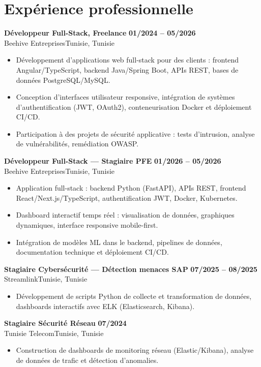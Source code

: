 \documentclass[a4paper,10pt]{article}
\newcommand{\cventry}[4]{\textbf{#1} \hfill \textbf{#4}\\[1pt]#2{\ifx\relax#3\relax\else, #3\fi}\par\vspace{1pt}}
\begin{document}
\section{Expérience professionnelle}
\cventry{Développeur Full-Stack, Freelance}{Beehive Entreprises}{Tunisie}{01/2024 -- 05/2026}
\begin{itemize}
  \item Développement d'applications web full-stack pour des clients : frontend Angular/TypeScript, backend Java/Spring Boot, APIs REST, bases de données PostgreSQL/MySQL.
  \item Conception d'interfaces utilisateur responsive, intégration de systèmes d'authentification (JWT, OAuth2), conteneurisation Docker et déploiement CI/CD.
  \item Participation à des projets de sécurité applicative : tests d'intrusion, analyse de vulnérabilités, remédiation OWASP.
\end{itemize}
\cventry{Développeur Full-Stack --- Stagiaire PFE}{Beehive Entreprises}{Tunisie}{01/2026 -- 05/2026}
\begin{itemize}
  \item Application full-stack : backend Python (FastAPI), APIs REST, frontend React/Next.js/TypeScript, authentification JWT, Docker, Kubernetes.
  \item Dashboard interactif temps réel : visualisation de données, graphiques dynamiques, interface responsive mobile-first.
  \item Intégration de modèles ML dans le backend, pipelines de données, documentation technique et déploiement CI/CD.
\end{itemize}
\cventry{Stagiaire Cybersécurité --- Détection menaces SAP}{Streamlink}{Tunisie}{07/2025 -- 08/2025}
\begin{itemize}
  \item Développement de scripts Python de collecte et transformation de données, dashboards interactifs avec ELK (Elasticsearch, Kibana).
\end{itemize}
\cventry{Stagiaire Sécurité Réseau}{Tunisie Telecom}{Tunisie}{07/2024}
\begin{itemize}
  \item Construction de dashboards de monitoring réseau (Elastic/Kibana), analyse de données de trafic et détection d'anomalies.
\end{itemize}
\end{document}
